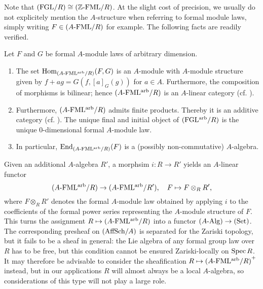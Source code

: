 \documentclass[../main.tex]{subfiles}
\begin{document}
Note that ${(\mathrm{FGL}/{R})} \cong {({\mathbb{Z}}\textnormal-\allowbreak\mathrm{FML}/{R})}$.
At the slight cost of precision, we usually do not explicitely mention the
$A$-structure when referring to formal module laws, simply writing $F \in
{({A}\textnormal-\allowbreak\mathrm{FML}/{R})}$ for example. 
The following facts are readily verified.
\begin{lem}
  Let $F$ and $G$ be formal $A$-module laws of arbitrary dimension.
  \begin{enumerate}
    \item The set $\operatorname{Hom}_{{({A}\textnormal-\allowbreak\mathrm{FML^{arb}}/{R})}} (F,G)$
      is an $A$-module with $A$-module structure
      given by $f+ag = G(f,[a]_G(g))$ for $a \in A$. 
      Furthermore, the composition of morphisms is bilinear; hence
      ${({A}\textnormal-\allowbreak\mathrm{FML^{arb}}/{R})}$ is an $A$-linear category (cf.
      \cite[\href{https://stacks.math.columbia.edu/tag/09MI}{Tag
      09MI}]{stacks-project}). 
    \item Furthermore, ${({A}\textnormal-\allowbreak\mathrm{FML^{arb}}/{R})}$ admits finite products. Thereby it is 
      an additive category (cf.
      \cite[\href{https://stacks.math.columbia.edu/tag/0104}{Tag
      0104}]{stacks-project}).
      The unique final and initial object of ${(\mathrm{FGL^{arb}}/{R})}$ is the unique
      $0$-dimensional formal $A$-module law.
    \item In particular, $\operatorname{End}_{{({A}\textnormal-\allowbreak\mathrm{FML^{arb}}/{R})}}(F)$ is a (possibly non-commutative)
      $A$-algebra.
  \end{enumerate}
\end{lem}

Given an additional $A$-algebra $R'$, a morphsim
$i\colon R \to R'$ yields an $A$-linear functor 
\begin{equation*}
    {({A}\textnormal-\allowbreak\mathrm{FML^{arb}}/{R})} \to {({A}\textnormal-\allowbreak\mathrm{FML^{arb}}/{R'})}, \quad
    F \mapsto F \otimes_R R',
\end{equation*}
where $F \otimes_R R'$ denotes the formal $A$-module law obtained by applying $i$
to the coefficients of the formal power series representing the $A$-module structure of $F$. 
This turns the assignment $R \mapsto {({A}\textnormal-\allowbreak\mathrm{FML^{arb}}/{R})}$ into a 
functor ${({A}\textnormal-\allowbreak\mathrm{Alg})} \to {(\mathrm{Set})}$. The corresponding presheaf on ${(\mathrm{AffSch}/{A})}$ is
separated for the Zariski topology, 
but it fails to be a sheaf in general: the Lie algebra of any
formal group law over $R$ has to be free, but this condition cannot be 
ensured Zariski-locally on $\operatorname{Spec} R$. It may therefore be 
advisable to consider the sheafification $R \mapsto {({A}\textnormal-\allowbreak\mathrm{FML^{arb}}/{R})}^+$ instead,
but in our applications
$R$ will almost always be a local $A$-algebra, so considerations
of this type will not play a large role.
\end{document}
